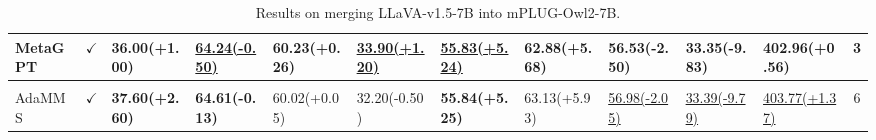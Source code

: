 \begin{table*}[!ht]
{\begin{tabular}{lclllllllllc}
        MetaGPT & $\checkmark$ & 36.00\footnotesize(+1.00) & \underline{64.24\footnotesize(-0.50)} & 60.23\footnotesize(+0.26) & \underline{33.90\footnotesize(+1.20)} & \underline{55.83\footnotesize(+5.24)} & 62.88\footnotesize(+5.68) & 56.53\footnotesize(-2.50) & 33.35\footnotesize(-9.83) & 402.96\footnotesize(+0.56) & 3
          \\[0.5ex] 
        
       \hline
       
\rowcolor{gray!20}
\multicolumn{12}{c}{\textbf{Our Method}} \\
\hline 
                      
       AdaMMS &$\checkmark$& \textbf{37.60\footnotesize(+2.60)} & \textbf{64.61\footnotesize(-0.13)} & 60.02\footnotesize(+0.05) & 32.20\footnotesize(-0.50) & \textbf{55.84\footnotesize(+5.25)} & 63.13\footnotesize(+5.93) & \underline{56.98\footnotesize(-2.05)} & \underline{33.39\footnotesize(-9.79)} & \underline{403.77\footnotesize(+1.37)} & 6\\
        \bottomrule
    \end{tabular}%
        }
    \caption{Results on merging LLaVA-v1.5-7B into mPLUG-Owl2-7B.}
    \label{tab:llava2mplug}
\end{table*}


